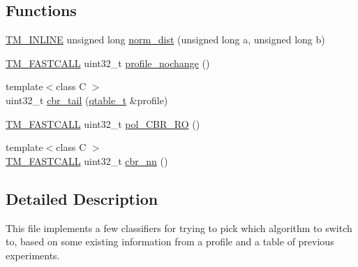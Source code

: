 \subsection*{Functions}
\begin{DoxyCompactItemize}
\item 
\hyperlink{platform_8hpp_abdc8d70d196a73a2a119efdbe674ecf8}{T\-M\-\_\-\-I\-N\-L\-I\-N\-E} unsigned long \hyperlink{namespaceanonymous__namespace_02cbr_8cpp_03_a9581e1f6511c6795fbd98578ecea3b78}{norm\-\_\-dist} (unsigned long a, unsigned long b)
\item 
\hyperlink{platform_8hpp_a8b5d728e6eed8f368f9966f637d2f719}{T\-M\-\_\-\-F\-A\-S\-T\-C\-A\-L\-L} uint32\-\_\-t \hyperlink{namespaceanonymous__namespace_02cbr_8cpp_03_a24ec6eb1e0eca0a6b9866180e5e3ecb0}{profile\-\_\-nochange} ()
\item 
{\footnotesize template$<$class C $>$ }\\uint32\-\_\-t \hyperlink{namespaceanonymous__namespace_02cbr_8cpp_03_a6d59ee82837d29707c2f774262228976}{cbr\-\_\-tail} (\hyperlink{structstm_1_1qtable__t}{qtable\-\_\-t} \&profile)
\item 
\hyperlink{platform_8hpp_a8b5d728e6eed8f368f9966f637d2f719}{T\-M\-\_\-\-F\-A\-S\-T\-C\-A\-L\-L} uint32\-\_\-t \hyperlink{namespaceanonymous__namespace_02cbr_8cpp_03_a0566a8b94db9550484ad458e48c3d7f9}{pol\-\_\-\-C\-B\-R\-\_\-\-R\-O} ()
\item 
{\footnotesize template$<$class C $>$ }\\\hyperlink{platform_8hpp_a8b5d728e6eed8f368f9966f637d2f719}{T\-M\-\_\-\-F\-A\-S\-T\-C\-A\-L\-L} uint32\-\_\-t \hyperlink{namespaceanonymous__namespace_02cbr_8cpp_03_a4ddd26e7ad4488682da335e5ad1a3351}{cbr\-\_\-nn} ()
\end{DoxyCompactItemize}


\subsection{Detailed Description}
This file implements a few classifiers for trying to pick which algorithm to switch to, based on some existing information from a profile and a table of previous experiments. 

